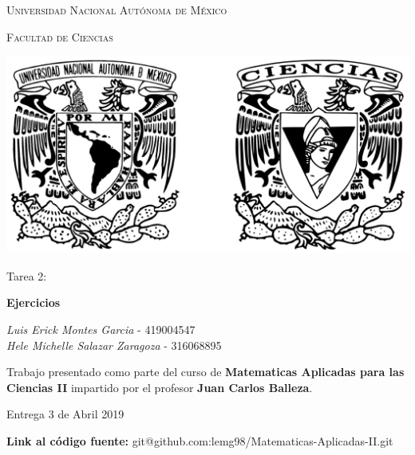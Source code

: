 \documentclass[10pt,letterpaper,fleqn]{article}
\begin{document}
\begin{titlepage}
    \centering

    {\scshape\LARGE Universidad Nacional Autónoma de México \par}

    \vspace{1cm}
    {\scshape\Large Facultad de Ciencias\par}
    \vspace{1.5cm}

    \begin{center}
        \includegraphics[scale=.1]{assets/img/logo.png}
    \end{center}

    \vspace{.8 cm}

    {\LARGE Tarea 2: \par}
    {\huge\bfseries Ejercicios \par}

    \vspace{0.5cm}
    \large{\itshape{Luis Erick Montes Garcia}} \small{ - 419004547}\\
    \large{\itshape{Hele Michelle Salazar Zaragoza}} \small{ - 316068895}


    \vfill

    Trabajo presentado como parte del curso de
    \textbf{Matematicas Aplicadas para las Ciencias II}
    impartido por el profesor \textbf{Juan Carlos Balleza}. \par
    \vspace{0.1cm}
    {\large Entrega 3 de Abril 2019 \par}
    \footnotesize{\textbf{Link al código fuente:} git@github.com:lemg98/Matematicas-Aplicadas-II.git}
\end{titlepage}
\end{document}
